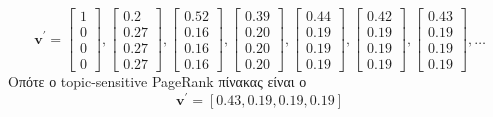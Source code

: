 \documentclass[a4paper,11pt]{article}
\begin{document}
\[
	\textbf{v}^\prime=
	\begin{bmatrix}1 \\ 0 \\ 0 \\ 0\end{bmatrix},
	\begin{bmatrix}0.2 \\ 0.27 \\ 0.27 \\ 0.27\end{bmatrix},
	\begin{bmatrix}0.52 \\ 0.16 \\ 0.16 \\ 0.16\end{bmatrix},
	\begin{bmatrix}0.39 \\ 0.20 \\ 0.20 \\ 0.20\end{bmatrix},
	\begin{bmatrix}0.44 \\ 0.19 \\ 0.19 \\ 0.19\end{bmatrix},
	\begin{bmatrix}0.42 \\ 0.19 \\ 0.19 \\ 0.19\end{bmatrix},
	\begin{bmatrix}0.43 \\ 0.19 \\ 0.19 \\ 0.19\end{bmatrix},
	\dots
\]
Οπότε ο topic-sensitive PageRank πίνακας είναι ο
\[ \textbf{v}^\prime = [0.43,0.19,0.19,0.19] \]
\end{document}
